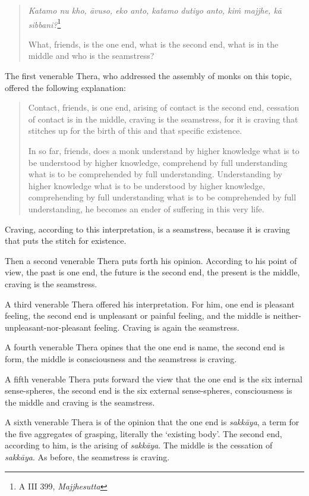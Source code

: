 \begin{quote}
\emph{Katamo nu kho, āvuso, eko anto, katamo dutiyo anto, kiṁ majjhe, kā sibbani?}\footnote{A III 399, \emph{Majjhesutta}}

What, friends, is the one end, what is the second end, what is in the middle and who is the seamstress?
\end{quote}

The first venerable Thera, who addressed the assembly of monks on this topic, offered the following explanation:

\begin{quote}
Contact, friends, is one end, arising of contact is the second end, cessation of contact is in the middle, craving is the seamstress, for it is craving that stitches up for the birth of this and that specific existence.

In so far, friends, does a monk understand by higher knowledge what is to be understood by higher knowledge, comprehend by full understanding what is to be comprehended by full understanding. Understanding by higher knowledge what is to be understood by higher knowledge, comprehending by full understanding what is to be comprehended by full understanding, he becomes an ender of suffering in this very life.
\end{quote}

Craving, according to this interpretation, is a seamstress, because it is craving that puts the stitch for existence.

Then a second venerable Thera puts forth his opinion. According to his point of view, the past is one end, the future is the second end, the present is the middle, craving is the seamstress.

A third venerable Thera offered his interpretation. For him, one end is pleasant feeling, the second end is unpleasant or painful feeling, and the middle is neither-unpleasant-nor-pleasant feeling. Craving is again the seamstress.

A fourth venerable Thera opines that the one end is name, the second end is form, the middle is consciousness and the seamstress is craving.

A fifth venerable Thera puts forward the view that the one end is the six internal sense-spheres, the second end is the six external sense-spheres, consciousness is the middle and craving is the seamstress.

A sixth venerable Thera is of the opinion that the one end is \emph{sakkāya}, a term for the five aggregates of grasping, literally the `existing body'. The second end, according to him, is the arising of \emph{sakkāya}. The middle is the cessation of \emph{sakkāya}. As before, the seamstress is craving.

